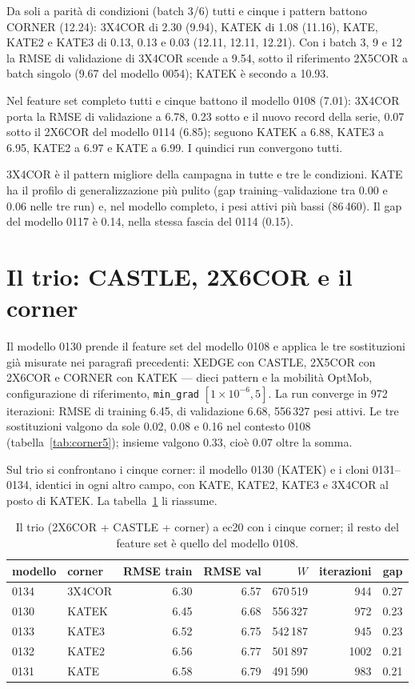 Da soli a parità di condizioni (batch 3/6) tutti e cinque i
pattern battono CORNER (12.24): 3X4COR di 2.30 (9.94), KATEK
di 1.08 (11.16), KATE, KATE2 e KATE3 di 0.13, 0.13 e 0.03
(12.11, 12.11, 12.21). Con i batch 3, 9 e 12 la RMSE di
validazione di 3X4COR scende a 9.54, sotto il riferimento
2X5COR a batch singolo (9.67 del modello 0054); KATEK è
secondo a 10.93.

Nel feature set completo tutti e cinque battono il modello
0108 (7.01): 3X4COR porta la RMSE di validazione a 6.78,
0.23 sotto e il nuovo record della serie, 0.07 sotto il 2X6COR
del modello 0114 (6.85); seguono KATEK a 6.88, KATE3 a 6.95,
KATE2 a 6.97 e KATE a 6.99. I quindici run convergono tutti.

3X4COR è il pattern migliore della campagna in tutte e tre le
condizioni. KATE ha il profilo di generalizzazione più pulito
(gap training--validazione tra 0.00 e 0.06 nelle tre run) e,
nel modello completo, i pesi attivi più bassi (86\,460). Il
gap del modello 0117 è 0.14, nella stessa fascia del 0114
(0.15).

\section{Il trio: CASTLE, 2X6COR e il corner}

Il modello 0130 prende il feature set del modello 0108 e
applica le tre sostituzioni già misurate nei paragrafi
precedenti: XEDGE con CASTLE, 2X5COR con 2X6COR e CORNER con
KATEK — dieci pattern e la mobilità OptMob, configurazione di
riferimento, \texttt{min\_grad} $[1\times10^{-6}, 5]$. La run
converge in 972 iterazioni: RMSE di training 6.45, di
validazione 6.68, 556\,327 pesi attivi. Le tre sostituzioni
valgono da sole 0.02, 0.08 e 0.16 nel contesto 0108
(tabella~\ref{tab:corner5}); insieme valgono 0.33, cioè 0.07
oltre la somma.

Sul trio si confrontano i cinque corner: il modello 0130
(KATEK) e i cloni 0131--0134, identici in ogni altro campo,
con KATE, KATE2, KATE3 e 3X4COR al posto di KATEK. La
tabella~\ref{tab:trio} li riassume.

\begin{table}[ht]
\centering
\small
\begin{tabular}{llrrrrr}
\toprule
modello & corner & RMSE train & RMSE val & $W$ & iterazioni & gap \\
\midrule
0134 & 3X4COR & 6.30 & 6.57 & 670\,519 & 944 & 0.27 \\
0130 & KATEK & 6.45 & 6.68 & 556\,327 & 972 & 0.23 \\
0133 & KATE3 & 6.52 & 6.75 & 542\,187 & 945 & 0.23 \\
0132 & KATE2 & 6.56 & 6.77 & 501\,897 & 1002 & 0.21 \\
0131 & KATE & 6.58 & 6.79 & 491\,590 & 983 & 0.21 \\
\bottomrule
\end{tabular}
\caption{Il trio (2X6COR + CASTLE + corner) a ec20 con i cinque
corner; il resto del feature set è quello del modello 0108.}
\label{tab:trio}
\end{table}

